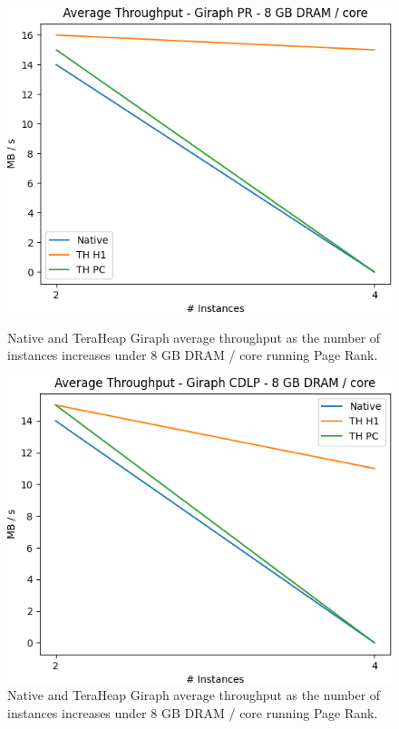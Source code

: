 \begin{figure}[thbp]
        \centering
        \includegraphics[width=\linewidth]{./fig/G_PR_128_THR.png}
    \caption{Native and TeraHeap Giraph average throughput
        as the number of instances increases under 8 GB DRAM / core running Page Rank.}
        \label{fig:g_pr128_thr}
        \includegraphics[width=\linewidth]{./fig/G_CDLP_128_THR.png}
    \caption{Native and TeraHeap Giraph average throughput
        as the number of instances increases under 8 GB DRAM / core running Page Rank.}
	\label{fig:g_cdlp128_thr}
\end{figure}

